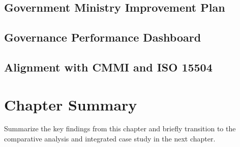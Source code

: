 
\subsection{Government Ministry Improvement Plan}




\subsection{Governance Performance Dashboard}






\subsection{Alignment with CMMI and ISO 15504}



\section*{Chapter Summary}

Summarize the key findings from this chapter and briefly transition to the comparative analysis and integrated case study in the next chapter.
